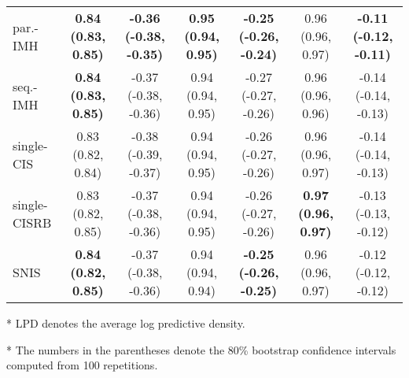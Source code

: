 \begin{table*}
\begin{threeparttable}
\begin{tabular}{lcccccc}
    par.-IMH & \textbf{0.84 {\scriptsize(0.83, 0.85)}} & \textbf{-0.36 {\scriptsize(-0.38, -0.35)}} & \textbf{0.95 {\scriptsize(0.94, 0.95)}} & \textbf{-0.25 {\scriptsize(-0.26, -0.24)}} & 0.96 {\scriptsize(0.96, 0.97)} & \textbf{-0.11 {\scriptsize(-0.12, -0.11)}} \\
    seq.-IMH & \textbf{0.84 {\scriptsize(0.83, 0.85)}} & -0.37 {\scriptsize(-0.38, -0.36)} & 0.94 {\scriptsize(0.94, 0.95)} & -0.27 {\scriptsize(-0.27, -0.26)} & 0.96 {\scriptsize(0.96, 0.96)} & -0.14 {\scriptsize(-0.14, -0.13)} \\
    single-CIS & 0.83 {\scriptsize(0.82, 0.84)} & -0.38 {\scriptsize(-0.39, -0.37)} & 0.94 {\scriptsize(0.94, 0.95)} & -0.26 {\scriptsize(-0.27, -0.26)} & 0.96 {\scriptsize(0.96, 0.97)} & -0.14 {\scriptsize(-0.14, -0.13)} \\
    single-CISRB & 0.83 {\scriptsize(0.82, 0.85)} & -0.37 {\scriptsize(-0.38, -0.36)} & 0.94 {\scriptsize(0.94, 0.95)} & -0.26 {\scriptsize(-0.27, -0.26)} & \textbf{0.97 {\scriptsize(0.96, 0.97)}} & -0.13 {\scriptsize(-0.13, -0.12)} \\
    SNIS & \textbf{0.84 {\scriptsize(0.82, 0.85)}} & -0.37 {\scriptsize(-0.38, -0.36)} & 0.94 {\scriptsize(0.94, 0.94)} & \textbf{-0.25 {\scriptsize(-0.26, -0.25)}} & 0.96 {\scriptsize(0.96, 0.97)} & -0.12 {\scriptsize(-0.12, -0.12)} \\\bottomrule
  \end{tabular}
  \begin{tablenotes}
    \item[*]{\footnotesize LPD denotes the average log predictive density.}
    \item[*]{\footnotesize The numbers in the parentheses denote the 80\% bootstrap confidence intervals computed from 100 repetitions.}
  \end{tablenotes}
  \end{threeparttable}
  \vspace{-0.05in}
\end{table*}

